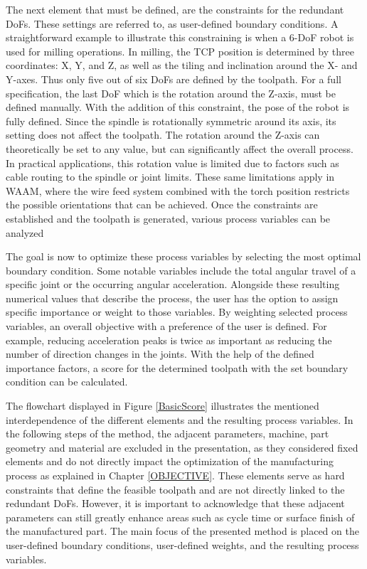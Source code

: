 \documentclass[conference]{IEEEtran}
\begin{document}
The next element that must be defined, are the constraints for the redundant DoFs. These settings are referred to, as user-defined boundary conditions. A straightforward example to illustrate this constraining is when a 6-DoF robot is used for milling operations. In milling, the TCP position is determined by three coordinates: X, Y, and Z, as well as the tiling and inclination around the X- and Y-axes. Thus only five out of six DoFs are defined by the toolpath. For a full specification, the last DoF which is the rotation around the Z-axis, must be defined manually. With the addition of this constraint, the pose of the robot is fully defined. Since the spindle is rotationally symmetric around its axis, its setting does not affect the toolpath. The rotation around the Z-axis can theoretically be set to any value, but can significantly affect the overall process. In practical applications, this rotation value is limited due to factors such as cable routing to the spindle or joint limits. These same limitations apply in WAAM, where the wire feed system combined with the torch position restricts the possible orientations that can be achieved. Once the constraints are established and the toolpath is generated, various process variables can be analyzed 

The goal is now to optimize these process variables by selecting the most optimal boundary condition. Some notable variables include the total angular travel of a specific joint or the occurring angular acceleration. Alongside these resulting numerical values that describe the process, the user has the option to assign specific importance or weight to those variables. By weighting selected process variables, an overall objective with a preference of the user is defined. For example, reducing acceleration peaks is twice as important as reducing the number of direction changes in the joints. With the help of the defined importance factors, a score for the determined toolpath with the set boundary condition can be calculated.

The flowchart displayed in Figure \ref{BasicScore} illustrates the mentioned interdependence of the different elements and the resulting process variables.
In the following steps of the method, the adjacent parameters, machine, part geometry and material are excluded in the presentation, as they considered fixed elements and do not directly impact the optimization of the manufacturing process as explained in Chapter \ref{OBJECTIVE}. These elements serve as hard constraints that define the feasible toolpath and are not directly linked to the redundant DoFs. However, it is important to acknowledge that these adjacent parameters can still greatly enhance areas such as cycle time or surface finish of the manufactured part. The main focus of the presented method is placed on the user-defined boundary conditions, user-defined weights, and the resulting process variables.
\end{document}
